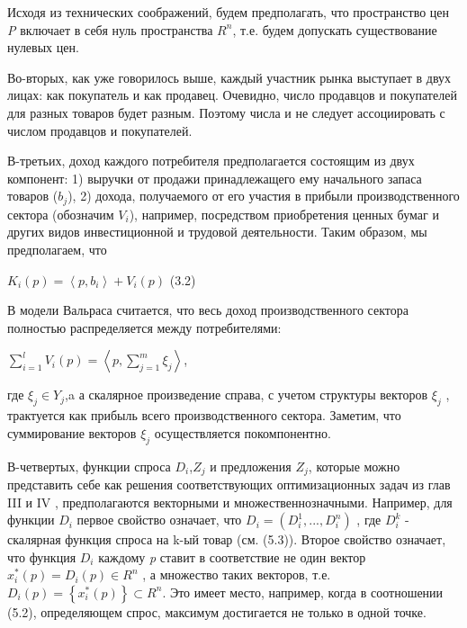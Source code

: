 \documentclass[12pt, 4paper]{book}
\begin{document}
{Исходя из технических соображений, будем предполагать, что пространство цен \textit{P} включает в себя нуль пространства $R^n$, т.е. будем допускать существование нулевых цен.
\par

Во-вторых, как уже говорилось выше, каждый участник рынка выступает в двух лицах: как покупатель и как продавец. Очевидно, число продавцов и покупателей для разных товаров будет разным. Поэтому числа и не следует ассоциировать с числом продавцов и покупателей.
\par

В-третьих, доход каждого потребителя предполагается состоящим из двух компонент: 1) выручки от продажи принадлежащего ему начального запаса товаров ($b_j$), 2) дохода, получаемого от его участия в прибыли производственного сектора (обозначим $V_i$), например, посредством приобретения ценных бумаг и других видов инвестиционной и трудовой деятельности. Таким образом, мы предполагаем, что
\begin{center}
$K_i(p) = \left\langle p,b_i \right\rangle + V_i(p)$ (3.2)
\end{center}
\par

В модели Вальраса считается, что весь доход производственного сектора полностью распределяется между потребителями:
\begin{center}
$\sum\limits_{i=1}^{l}V_i(p)=\left\langle p,\sum\limits_{j=1}^{m}\xi_j\right\rangle$,
\end{center}
где $\xi_j \in Y_j$,a а скалярное произведение справа, с учетом структуры векторов $\xi_j$ , трактуется как прибыль всего производственного сектора. Заметим, что суммирование векторов $\xi_j$ осуществляется покомпонентно.
\par

В-четвертых, функции спроса $D_i$,$Z_j$ и предложения $Z_j$, которые можно представить себе как решения соответствующих оптимизационных задач из глав III и IV , предполагаются векторными и множественнозначными. Например, для функции $D_i$ первое свойство означает, что $D_i=(D_{i}^{1},...,D_{i}^{n})$ , где $D_{i}^{k}$ - скалярная функция спроса на k-ый товар (см. (5.3)). Второе свойство означает, что функция $D_i$ каждому \textit{p} ставит в соответствие не один вектор $x_{i}^{*}(p)=D_i(p) \in R^n$ , а множество таких векторов, т.е. $D_i(p)=\left\{x_{i}^{*}(p)\right\} \subset R^n$. Это имеет место, например, когда в соотношении (5.2), определяющем спрос, максимум достигается не только в одной точке.
\par

}
\end{document}
